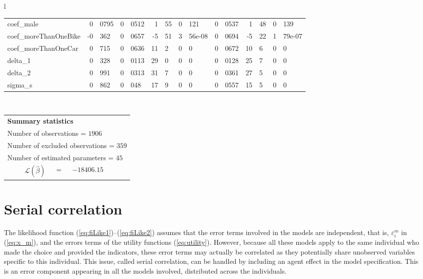 \documentclass[12pt,a4paper]{article}
\newcommand{\req}[1]{(\ref{#1})}
\begin{document}
\begin{sidewaystable}[htb]
\begin{tabular}{l}
\begin{tabular}{lr@{.}lr@{.}lr@{.}lr@{.}lr@{.}lr@{.}lr@{.}l}
coef\_male                  &  0&0795 &   0&0512 &    1&55 &    0&121 &        0&0537 &         1&48 &         0&139 \\
coef\_moreThanOneBike       &  -0&362 &   0&0657 &   -5&51 & 3&56e-08 &        0&0694 &        -5&22 &      1&79e-07 \\
coef\_moreThanOneCar        &   0&715 &   0&0636 &    11&2 &      0&0 &        0&0672 &         10&6 &           0&0 \\
delta\_1                    &   0&328 &   0&0113 &    29&0 &      0&0 &        0&0128 &         25&7 &           0&0 \\
delta\_2                    &   0&991 &   0&0313 &    31&7 &      0&0 &        0&0361 &         27&5 &           0&0 \\
sigma\_s                    &   0&862 &    0&048 &    17&9 &      0&0 &        0&0557 &         15&5 &           0&0 \\

\hline
\end{tabular}
\\
\begin{tabular}{rcl}
\multicolumn{3}{l}{\bf Summary statistics}\\
\multicolumn{3}{l}{ Number of observations = $1906$} \\
\multicolumn{3}{l}{ Number of excluded observations = $359$} \\
\multicolumn{3}{l}{ Number of estimated  parameters = $45$} \\
 $\mathcal{L}(\hat{\beta})$ &=& $-18406.15 $  \\
\end{tabular}
  \end{tabular}
 \end{sidewaystable}

\clearpage

\section{Serial correlation}

The likelihood function \req{eq:fiLike1}--\req{eq:fiLike2} assumes
that the error terms involved in the models are independent, that is,
$\varepsilon^{m}_i$ in \req{eq:x_m}, and the errors terms of the utility
functions \req{eq:utility}. However, because all these models apply to
the same individual who made the choice and provided the indicators,
these error terms may actually be correlated as they potentially share
unobserved variables specific to this individual. This issue, called
serial correlation, can be handled by including an agent effect in the
model specification. This is an error component appearing in all the
models involved, distributed across the individuals.
\end{document}
